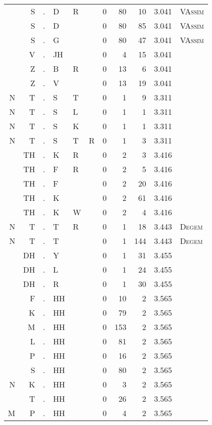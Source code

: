 \begin{longtable}{r@{ } r@{ } c@{ } l@{ } l@{ } l@{ } r r r r l }
  & S & . & D & R &   & 0 & 80 & 10 & 3.041 & \textsc{VAssim} \\
  & S & . & D &   &   & 0 & 80 & 85 & 3.041 & \textsc{VAssim} \\
  & S & . & G &   &   & 0 & 80 & 47 & 3.041 & \textsc{VAssim} \\
  & V & . & JH &   &   & 0 & 4 & 15 & 3.041 &  \\
  & Z & . & B & R &   & 0 & 13 & 6 & 3.041 &  \\
  & Z & . & V &   &   & 0 & 13 & 19 & 3.041 &  \\
N & T & . & S & T &   & 0 & 1 & 9 & 3.311 &  \\
N & T & . & S & L &   & 0 & 1 & 1 & 3.311 &  \\
N & T & . & S & K &   & 0 & 1 & 1 & 3.311 &  \\
N & T & . & S & T & R & 0 & 1 & 3 & 3.311 &  \\
  & TH & . & K & R &   & 0 & 2 & 3 & 3.416 &  \\
  & TH & . & F & R &   & 0 & 2 & 5 & 3.416 &  \\
  & TH & . & F &   &   & 0 & 2 & 20 & 3.416 &  \\
  & TH & . & K &   &   & 0 & 2 & 61 & 3.416 &  \\
  & TH & . & K & W &   & 0 & 2 & 4 & 3.416 &  \\
N & T & . & T & R &   & 0 & 1 & 18 & 3.443 & \textsc{Degem} \\
N & T & . & T &   &   & 0 & 1 & 144 & 3.443 & \textsc{Degem} \\
  & DH & . & Y &   &   & 0 & 1 & 31 & 3.455 &  \\
  & DH & . & L &   &   & 0 & 1 & 24 & 3.455 &  \\
  & DH & . & R &   &   & 0 & 1 & 30 & 3.455 &  \\
  & F & . & HH &   &   & 0 & 10 & 2 & 3.565 &  \\
  & K & . & HH &   &   & 0 & 79 & 2 & 3.565 &  \\
  & M & . & HH &   &   & 0 & 153 & 2 & 3.565 &  \\
  & L & . & HH &   &   & 0 & 81 & 2 & 3.565 &  \\
  & P & . & HH &   &   & 0 & 16 & 2 & 3.565 &  \\
  & S & . & HH &   &   & 0 & 80 & 2 & 3.565 &  \\
N & K & . & HH &   &   & 0 & 3 & 2 & 3.565 &  \\
  & T & . & HH &   &   & 0 & 26 & 2 & 3.565 &  \\
M & P & . & HH &   &   & 0 & 4 & 2 & 3.565 &  \\

\end{longtable}
